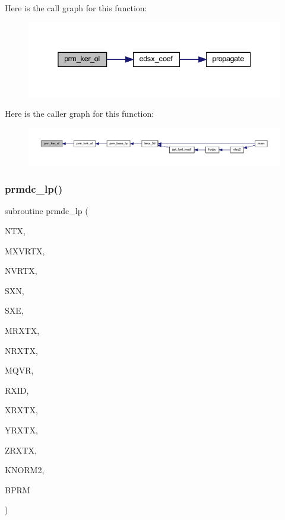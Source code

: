 Here is the call graph for this function\+:\nopagebreak
\begin{figure}[H]
\begin{center}
\leavevmode
\includegraphics[width=338pt]{Leroi_8f90_a5a775b5fbe7ca4b27ec968d5efde2795_cgraph}
\end{center}
\end{figure}
Here is the caller graph for this function\+:\nopagebreak
\begin{figure}[H]
\begin{center}
\leavevmode
\includegraphics[width=350pt]{Leroi_8f90_a5a775b5fbe7ca4b27ec968d5efde2795_icgraph}
\end{center}
\end{figure}
\mbox{\label{Leroi_8f90_a2332afca7e33269a0f374989bededf94}} 
\subsubsection{\texorpdfstring{prmdc\+\_\+lp()}{prmdc\_lp()}}
{\footnotesize\ttfamily subroutine prmdc\+\_\+lp (\begin{DoxyParamCaption}\item[{integer}]{N\+TX,  }\item[{integer}]{M\+X\+V\+R\+TX,  }\item[{integer, dimension(ntx)}]{N\+V\+R\+TX,  }\item[{real, dimension (mxvrtx,ntx)}]{S\+XN,  }\item[{real, dimension (mxvrtx,ntx)}]{S\+XE,  }\item[{integer}]{M\+R\+X\+TX,  }\item[{integer, dimension(ntx)}]{N\+R\+X\+TX,  }\item[{integer}]{M\+Q\+VR,  }\item[{integer, dimension(mrxtx,ntx)}]{R\+X\+ID,  }\item[{real, dimension (mrxtx,ntx,mqvr)}]{X\+R\+X\+TX,  }\item[{real, dimension (mrxtx,ntx,mqvr)}]{Y\+R\+X\+TX,  }\item[{real, dimension(mrxtx,ntx)}]{Z\+R\+X\+TX,  }\item[{integer, dimension(mrxtx,ntx)}]{K\+N\+O\+R\+M2,  }\item[{real, dimension(mrxtx,ntx)}]{B\+P\+RM }\end{DoxyParamCaption})}

